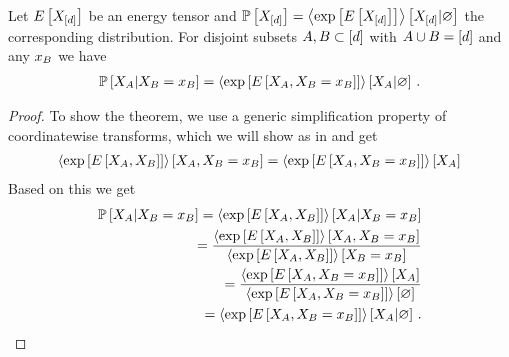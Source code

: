 \begin{theorem}
    \label{the:energyContractionQueries} %
    Let $E\left[X_{[d]}\right]$ be an energy tensor and $\mathbb{P}\left[X_{[d]}\right]=\left\langle \mathrm{exp}\left[E\left[X_{[d]}\right]\right]\right\rangle \left[ X_{[d]} | \varnothing \right]$ the corresponding distribution.
    For disjoint subsets $A,B \subset [d]$ with $A\cup B=[d]$ and any $x_{B}$ we have
    \begin{align*}
        \mathbb{P}\left[X_{A}|X_{B}=x_{B}\right]
        = \left\langle 
            \mathrm{exp}\left[E\left[X_{A},X_{B}=x_{B}\right]\right]
        \right\rangle \left[ X_{A} | \varnothing \right] \, .
    \end{align*}
\end{theorem}
\begin{proof}
    To show the theorem, we use a generic simplification property of coordinatewise transforms, which we will show as  in  and get
    \begin{align*}
        \left\langle \mathrm{exp}\left[E\left[X_{A},X_{B}\right]\right]\right\rangle \left[ X_{A},X_{B}=x_{B} \right]
        = \left\langle \mathrm{exp}\left[E\left[X_{A},X_{B}=x_{B}\right]\right]\right\rangle \left[ X_{A} \right]
    \end{align*}
    Based on this we get
    \begin{align*}
        \mathbb{P}\left[X_{A}|X_{B}=x_{B}\right]
        = \left\langle \mathrm{exp}\left[E\left[X_{A},X_{B}\right]\right]\right\rangle \left[ X_{A} | X_{B}=x_{B} \right] \\
        = \frac{\left\langle \mathrm{exp}\left[E\left[X_{A},X_{B}\right]\right]\right\rangle \left[ X_{A},X_{B}=x_{B} \right]}{
            \left\langle \mathrm{exp}\left[E\left[X_{A},X_{B}\right]\right]\right\rangle \left[ X_{B}=x_{B} \right]
        } \\
        = \frac{\left\langle \mathrm{exp}\left[E\left[X_{A},X_{B}=x_{B}\right]\right]\right\rangle \left[ X_{A} \right]}{
            \left\langle \mathrm{exp}\left[E\left[X_{A},X_{B}=x_{B}\right]\right]\right\rangle \left[ \varnothing \right]
        } \\
        = \left\langle 
            \mathrm{exp}\left[E\left[X_{A},X_{B}=x_{B}\right]\right]
        \right\rangle \left[ X_{A} | \varnothing \right] \, .
    \end{align*}
\end{proof}

